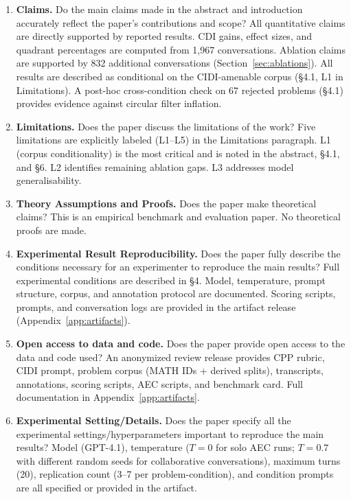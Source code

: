 \documentclass{article}
\begin{document}
\begin{enumerate}

\item \textbf{Claims.} Do the main claims made in the abstract and introduction accurately reflect the paper's contributions and scope?
\answerYes{} All quantitative claims are directly supported by reported results. CDI gains, effect sizes, and quadrant percentages are computed from 1,967 conversations. Ablation claims are supported by 832 additional conversations (Section~\ref{sec:ablations}). All results are described as conditional on the CIDI-amenable corpus (§4.1, L1 in Limitations). A post-hoc cross-condition check on 67 rejected problems (§4.1) provides evidence against circular filter inflation.

\item \textbf{Limitations.} Does the paper discuss the limitations of the work?
\answerYes{} Five limitations are explicitly labeled (L1--L5) in the Limitations paragraph. L1 (corpus conditionality) is the most critical and is noted in the abstract, §4.1, and §6. L2 identifies remaining ablation gaps. L3 addresses model generalisability.

\item \textbf{Theory Assumptions and Proofs.} Does the paper make theoretical claims?
\answerNA{} This is an empirical benchmark and evaluation paper. No theoretical proofs are made.

\item \textbf{Experimental Result Reproducibility.} Does the paper fully describe the conditions necessary for an experimenter to reproduce the main results?
\answerYes{} Full experimental conditions are described in §4. Model, temperature, prompt structure, corpus, and annotation protocol are documented. Scoring scripts, prompts, and conversation logs are provided in the artifact release (Appendix~\ref{app:artifacts}).

\item \textbf{Open access to data and code.} Does the paper provide open access to the data and code used?
\answerYes{} An anonymized review release provides CPP rubric, CIDI prompt, problem corpus (MATH IDs + derived splits), transcripts, annotations, scoring scripts, AEC scripts, and benchmark card. Full documentation in Appendix~\ref{app:artifacts}.

\item \textbf{Experimental Setting/Details.} Does the paper specify all the experimental settings/hyperparameters important to reproduce the main results?
\answerYes{} Model (GPT-4.1), temperature ($T = 0$ for solo AEC runs; $T = 0.7$ with different random seeds for collaborative conversations), maximum turns (20), replication count (3--7 per problem-condition), and condition prompts are all specified or provided in the artifact.


\end{enumerate}
\end{document}
